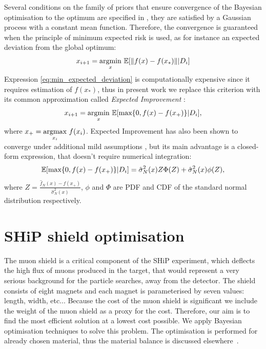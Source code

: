 \documentclass[a4paper]{jpconf}
\theoremstyle{my_theorem_style}
\numberwithin{equation}{section}
\begin{document}
Several conditions on the family of priors that ensure convergence of the Bayesian optimisation to the optimum are specified in \cite{Mockus1994}, they are satisfied by a Gaussian process with a constant mean function. Therefore, the convergence is guaranteed when the principle of minimum expected risk is used, as for instance an expected deviation from the global optimum:
\begin{equation}
\label{eq:min_expected_deviation}
x_{i + 1} = \underset{x}{\textup{argmin}}\ \mathbb{E}[\|f(x) - f(x_*)\|  | D_i]
\end{equation}
Expression \ref{eq:min_expected_deviation} is computationally expensive since it requires estimation of $f(x_*)$, thus in present work we replace this criterion with its common approximation called \emph{Expected Improvement} \cite{Mockus1978}:
\begin{equation}
\label{EI}
x_{i + 1} = \underset{x}{\textup{argmin}}\ \mathbb{E}[\textup{max}\{0, f(x) - f(x_+)\}  | D_i],
\end{equation} 
where $x_+ = \underset{x_i}{\textup{argmax}}\  f(x_i)$.
Expected Improvement has also been shown to converge under additional mild assumptions \cite{vazquez2010convergence}, but its main advantage is a closed-form expression, that doesn't require numerical integration:
\begin{equation}
\label{EI:closed_form}
\mathbb{E}[\textup{max}\{0, f(x) - f(x_+)\}  | D_i] = \hat{\sigma}_N^2(x) Z \Phi(Z) + \hat{\sigma}_N^2(x) \phi(Z),
\end{equation}
where $Z = \frac{\hat{f}_N(x) - f(x_+)}{\hat{\sigma}_N^2(x)}$, $\phi$ and $\Phi$ are PDF and CDF of the standard normal distribution respectively.


\section{SHiP shield optimisation}

The muon shield is a critical component of the SHiP experiment, which deflects the
high flux of muons produced in the target, that would represent a very
serious  background for the particle searches, away from the
detector. The shield consists of eight magnets and each magnet is
parameterised by seven values: length, width, etc... Because the cost of the
muon shield is significant we include the weight of the muon shield as
a proxy for the cost. Therefore, our aim is to find the most efficient
solution at a lowest cost possible. We apply Bayesian optimisation
techniques to solve this problem. The optimisation is performed for already chosen material, thus the material balance is discussed elsewhere~\cite{Akmete:2017bpl}.
\end{document}
